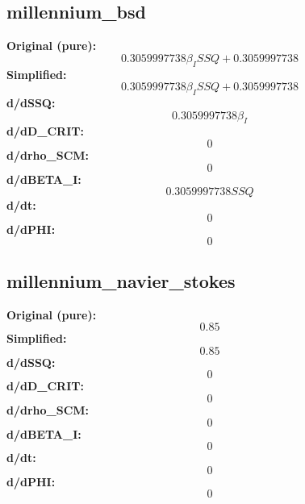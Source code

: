 \subsection{millennium_bsd}
\textbf{Original (pure):}
\begin{equation}
0.3059997738 \beta_{I} SSQ + 0.3059997738
\end{equation}
\textbf{Simplified:}
\begin{equation}
0.3059997738 \beta_{I} SSQ + 0.3059997738
\end{equation}
\textbf{d/dSSQ:}
\begin{equation}
0.3059997738 \beta_{I}
\end{equation}
\textbf{d/dD_CRIT:}
\begin{equation}
0
\end{equation}
\textbf{d/drho_SCM:}
\begin{equation}
0
\end{equation}
\textbf{d/dBETA_I:}
\begin{equation}
0.3059997738 SSQ
\end{equation}
\textbf{d/dt:}
\begin{equation}
0
\end{equation}
\textbf{d/dPHI:}
\begin{equation}
0
\end{equation}

\subsection{millennium_navier_stokes}
\textbf{Original (pure):}
\begin{equation}
0.85
\end{equation}
\textbf{Simplified:}
\begin{equation}
0.85
\end{equation}
\textbf{d/dSSQ:}
\begin{equation}
0
\end{equation}
\textbf{d/dD_CRIT:}
\begin{equation}
0
\end{equation}
\textbf{d/drho_SCM:}
\begin{equation}
0
\end{equation}
\textbf{d/dBETA_I:}
\begin{equation}
0
\end{equation}
\textbf{d/dt:}
\begin{equation}
0
\end{equation}
\textbf{d/dPHI:}
\begin{equation}
0
\end{equation}

